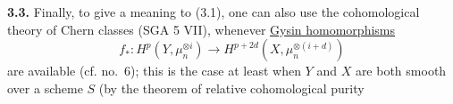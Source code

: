 \textbf{3.3.} Finally, to give a meaning to (3.1), one can also use the cohomological theory of Chern classes (SGA 5 VII), whenever \uline{Gysin homomorphisms}
\[
 f_*:H^p(Y,\mu_n^{\otimes i})\longrightarrow H^{p+2d}(X,\mu_n^{\otimes(i+d)})
\]
are available (cf. no.~6); this is the case at least when $Y$ and $X$ are both smooth over a scheme $S$ (by the theorem of relative cohomological purity

